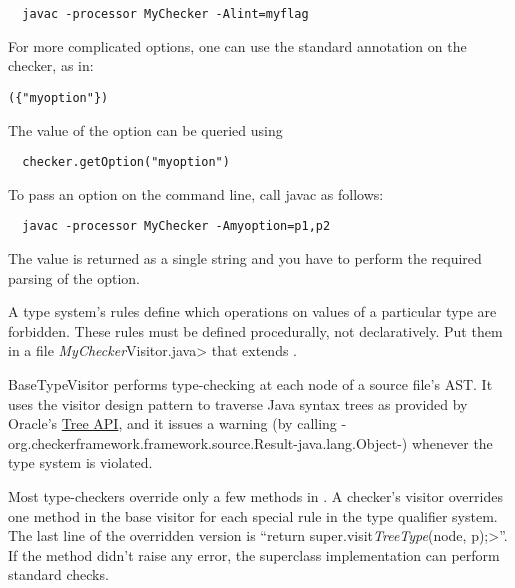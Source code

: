 \begin{Verbatim}
  javac -processor MyChecker -Alint=myflag
\end{Verbatim}



For more complicated options, one can use the standard
 annotation on the checker, as in:

\begin{alltt}
  (\{"myoption"\})
\end{alltt}

The value of the option can be queried using

\begin{Verbatim}
  checker.getOption("myoption")
\end{Verbatim}

To pass an option on the command line, call javac as follows:

\begin{Verbatim}
  javac -processor MyChecker -Amyoption=p1,p2
\end{Verbatim}

The value is returned as a single string and you have to perform the
required parsing of the option.





A type system's rules define which operations on values of a
particular type are forbidden.
These rules must be defined procedurally, not declaratively.
Put them in a file \<\emph{MyChecker}Visitor.java> that extends
.

BaseTypeVisitor performs type-checking at each node of a
source file's AST\@.  It uses the visitor design pattern to traverse
Java syntax trees as provided by Oracle's
\href{https://docs.oracle.com/javase/8/docs/jdk/api/javac/tree/}{Tree
API},
and it issues a warning (by calling
{-org.checkerframework.framework.source.Result-java.lang.Object-})
whenever the type system is violated.

Most type-checkers
override only a few methods in .
A checker's visitor overrides one method in the base visitor for each special
rule in the type qualifier system.
The last line of the overridden version is
``\<return super.visit\emph{TreeType}(node, p);>''.
If the method didn't raise any error,
the superclass implementation can perform standard checks.


